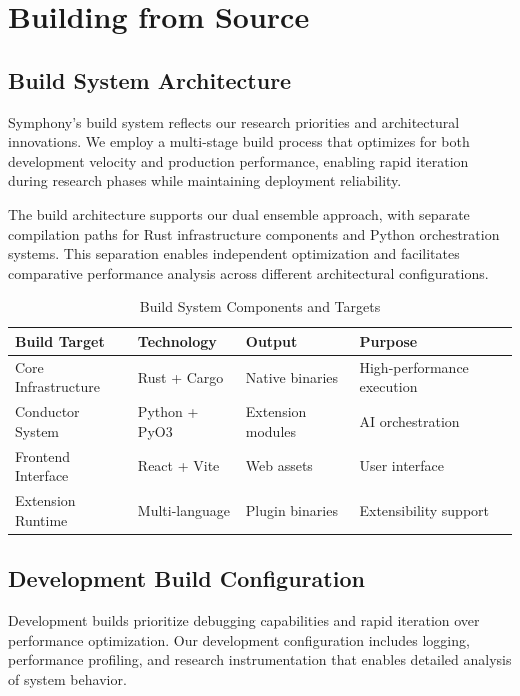 \section*{Building from Source}

\subsection*{Build System Architecture}

Symphony's build system reflects our research priorities and architectural innovations. We employ a multi-stage build process that optimizes for both development velocity and production performance, enabling rapid iteration during research phases while maintaining deployment reliability.

The build architecture supports our dual ensemble approach, with separate compilation paths for Rust infrastructure components and Python orchestration systems. This separation enables independent optimization and facilitates comparative performance analysis across different architectural configurations.

\begin{table}[ht]
\centering
\begin{tabular}{@{}llll@{}}
\toprule
\textbf{Build Target} & \textbf{Technology} & \textbf{Output} & \textbf{Purpose} \\
\midrule
Core Infrastructure & Rust + Cargo & Native binaries & High-performance execution \\
Conductor System & Python + PyO3 & Extension modules & AI orchestration \\
Frontend Interface & React + Vite & Web assets & User interface \\
Extension Runtime & Multi-language & Plugin binaries & Extensibility support \\
\bottomrule
\end{tabular}
\caption{Build System Components and Targets}
\end{table}

\subsection*{Development Build Configuration}

Development builds prioritize debugging capabilities and rapid iteration over performance optimization. Our development configuration includes logging, performance profiling, and research instrumentation that enables detailed analysis of system behavior.

